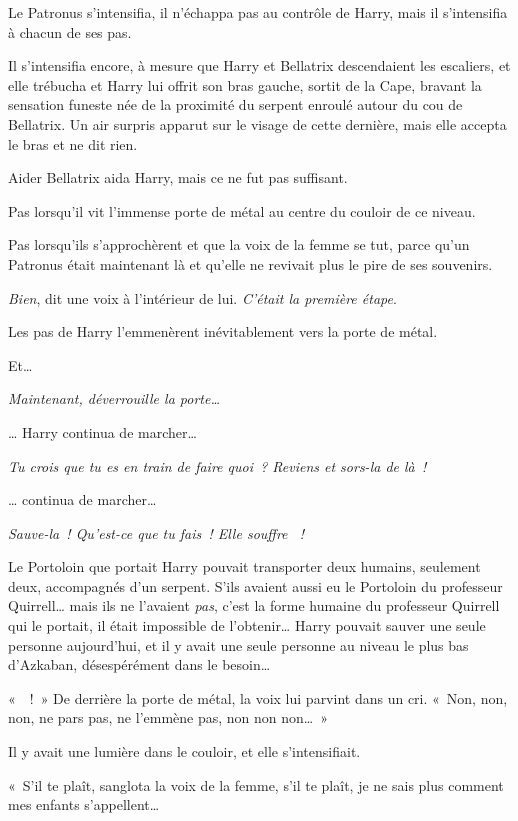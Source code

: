 Le Patronus s'intensifia, il n'échappa pas au contrôle de Harry, mais il s'intensifia à chacun de ses pas.

Il s'intensifia encore, à mesure que Harry et Bellatrix descendaient les escaliers, et elle trébucha et Harry lui offrit son bras gauche, sortit de la Cape, bravant la sensation funeste née de la proximité du serpent enroulé autour du cou de Bellatrix. Un air surpris apparut sur le visage de cette dernière, mais elle accepta le bras et ne dit rien.

Aider Bellatrix aida Harry, mais ce ne fut pas suffisant.

Pas lorsqu'il vit l'immense porte de métal au centre du couloir de ce niveau.

Pas lorsqu'ils s'approchèrent et que la voix de la femme se tut, parce qu'un Patronus était maintenant là et qu'elle ne revivait plus le pire de ses souvenirs.

\emph{Bien}, dit une voix à l'intérieur de lui. \emph{C'était la première étape}.

Les pas de Harry l'emmenèrent inévitablement vers la porte de métal.

Et…

\emph{Maintenant, déverrouille la porte…}

… Harry continua de marcher…

\emph{Tu crois que tu es en train de faire quoi~? Reviens et sors-la de là~!}

… continua de marcher…

\emph{Sauve-la~! Qu'est-ce que tu fais~! Elle souffre ~!}

Le Portoloin que portait Harry pouvait transporter deux humains, seulement deux, accompagnés d'un serpent. S'ils avaient aussi eu le Portoloin du professeur Quirrell… mais ils ne l'avaient \emph{pas}, c'est la forme humaine du professeur Quirrell qui le portait, il était impossible de l'obtenir… Harry pouvait sauver une seule personne aujourd'hui, et il y avait une seule personne au niveau le plus bas d'Azkaban, désespérément dans le besoin…

«~~!~» De derrière la porte de métal, la voix lui parvint dans un cri. «~Non, non, non, ne pars pas, ne l'emmène pas, non non non…~»

Il y avait une lumière dans le couloir, et elle s'intensifiait.

«~S'il te plaît, sanglota la voix de la femme, s'il te plaît, je ne sais plus comment mes enfants s'appellent…

